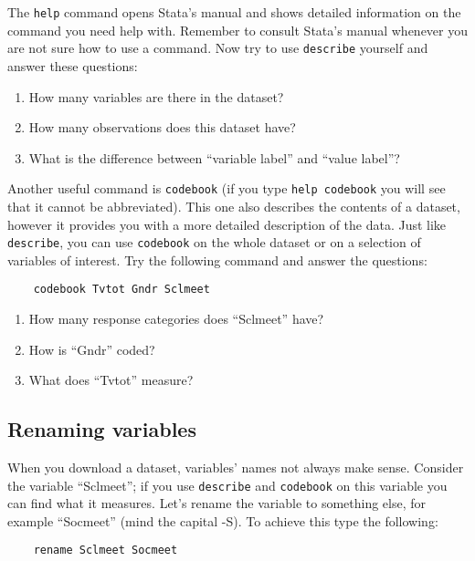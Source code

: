 \documentclass{article}
\begin{document}
The \texttt{help} command opens Stata's manual and shows detailed information on the command you need help with. Remember to consult Stata's manual whenever you are not sure how to use a command. Now try to use \texttt{describe} yourself and answer these questions:

\begin{enumerate}
	\item How many variables are there in the dataset?
	\item How many observations does this dataset have?
	\item What is the difference between ``variable label'' and ``value label''?
\end{enumerate}

Another useful command is \texttt{codebook} (if you type \texttt{help codebook} you will see that it cannot be abbreviated). This one also describes the contents of a dataset, however it provides you with a more detailed description of the data. Just like \texttt{describe}, you can use \texttt{codebook} on the whole dataset or on a selection of variables of interest. Try the following command and answer the questions:

\begin{lstlisting}
	codebook Tvtot Gndr Sclmeet
\end{lstlisting}

\begin{enumerate}
	\item How many response categories does ``Sclmeet'' have?
	\item How is ``Gndr'' coded?
	\item What does ``Tvtot'' measure?
\end{enumerate}

\subsection*{Renaming variables}

When you download a dataset, variables' names not always make sense. Consider the variable ``Sclmeet''; if you use \texttt{describe} and \texttt{codebook} on this variable you can find what it measures. Let's rename the variable to something else, for example ``Socmeet'' (mind the capital -S). To achieve this type the following:

\begin{lstlisting}
	rename Sclmeet Socmeet
\end{lstlisting}
\end{document}
